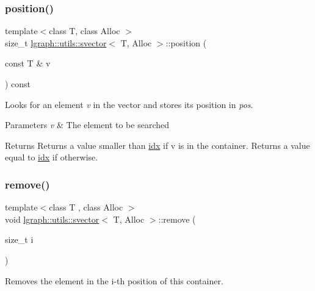 \subsubsection{\texorpdfstring{position()}{position()}}
{\footnotesize\ttfamily template$<$class T, class Alloc $>$ \\
size\+\_\+t \hyperlink{classlgraph_1_1utils_1_1svector}{lgraph\+::utils\+::svector}$<$ T, Alloc $>$\+::position (\begin{DoxyParamCaption}\item[{const T \&}]{v }\end{DoxyParamCaption}) const}



Looks for an element {\itshape v} in the vector and stores its position in {\itshape pos}. 


\begin{DoxyParams}{Parameters}
{\em v} & The element to be searched \\
\hline
\end{DoxyParams}
\begin{DoxyReturn}{Returns}
Returns a value smaller than \hyperlink{classlgraph_1_1utils_1_1svector_a7ef963c079c7dc8a6a559ceef81a241f}{idx} if v is in the container. Returns a value equal to \hyperlink{classlgraph_1_1utils_1_1svector_a7ef963c079c7dc8a6a559ceef81a241f}{idx} if otherwise. 
\end{DoxyReturn}
\mbox{\label{classlgraph_1_1utils_1_1svector_a9d377cbaa26f09a862334363e2d889cc}} 
\subsubsection{\texorpdfstring{remove()}{remove()}\hspace{0.1cm}{\footnotesize\ttfamily [1/2]}}
{\footnotesize\ttfamily template$<$class T , class Alloc $>$ \\
void \hyperlink{classlgraph_1_1utils_1_1svector}{lgraph\+::utils\+::svector}$<$ T, Alloc $>$\+::remove (\begin{DoxyParamCaption}\item[{size\+\_\+t}]{i }\end{DoxyParamCaption})}



Removes the element in the i-\/th position of this container. 


